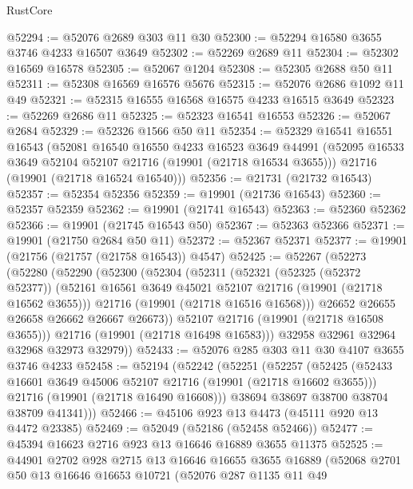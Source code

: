 \begin{lexlean}{RustCore}
\begin{coremodule}
@52294 := @52076 @2689 @303 @11 @30
@52300 := @52294 @16580 @3655 @3746 @4233 @16507 @3649
@52302 := @52269 @2689 @11
@52304 := @52302 @16569 @16578
@52305 := @52067 @1204
@52308 := @52305 @2688 @50 @11
@52311 := @52308 @16569 @16576 @5676
@52315 := @52076 @2686 @1092 @11 @49
@52321 := @52315 @16555 @16568 @16575 @4233 @16515 @3649
@52323 := @52269 @2686 @11
@52325 := @52323 @16541 @16553
@52326 := @52067 @2684
@52329 := @52326 @1566 @50 @11
@52354 := @52329
    @16541
    @16551
    @16543
    (@52081
      @16540
      @16550
      @4233
      @16523
      @3649
      @44991
      (@52095 @16533 @3649 @52104 @52107 @21716 (@19901 (@21718 @16534 @3655)))
      @21716
      (@19901 (@21718 @16524 @16540)))
@52356 := @21731 (@21732 @16543)
@52357 := @52354 @52356
@52359 := @19901 (@21736 @16543)
@52360 := @52357 @52359
@52362 := @19901 (@21741 @16543)
@52363 := @52360 @52362
@52366 := @19901 (@21745 @16543 @50)
@52367 := @52363 @52366
@52371 := @19901 (@21750 @2684 @50 @11)
@52372 := @52367 @52371
@52377 := @19901 (@21756 (@21757 (@21758 @16543)) @4547)
@52425 := @52267
    (@52273
      (@52280
        (@52290
          (@52300
            (@52304
              (@52311
                (@52321
                  (@52325 (@52372 @52377))
                  (@52161 @16561 @3649 @45021 @52107 @21716 (@19901 (@21718 @16562 @3655)))
                  @21716
                  (@19901 (@21718 @16516 @16568)))
                @26652
                @26655
                @26658
                @26662
                @26667
                @26673))
            @52107
            @21716
            (@19901 (@21718 @16508 @3655)))
          @21716
          (@19901 (@21718 @16498 @16583)))
        @32958
        @32961
        @32964
        @32968
        @32973
        @32979))
@52433 := @52076 @285 @303 @11 @30 @4107 @3655 @3746 @4233
@52458 := @52194
    (@52242
      (@52251
        (@52257
          (@52425
            (@52433 @16601 @3649 @45006 @52107 @21716 (@19901 (@21718 @16602 @3655)))
            @21716
            (@19901 (@21718 @16490 @16608)))
          @38694
          @38697
          @38700
          @38704
          @38709
          @41341)))
@52466 := @45106 @923 @13 @4473 (@45111 @920 @13 @4472 @23385)
@52469 := @52049 (@52186 (@52458 @52466))
@52477 := @45394 @16623 @2716 @923 @13 @16646 @16889 @3655 @11375
@52525 := @44901
    @2702
    @928
    @2715
    @13
    @16646
    @16655
    @3655
    @16889
    (@52068
      @2701
      @50
      @13
      @16646
      @16653
      @10721
      (@52076
        @287
        @1135
        @11
        @49

\end{coremodule}
\end{lexlean}
